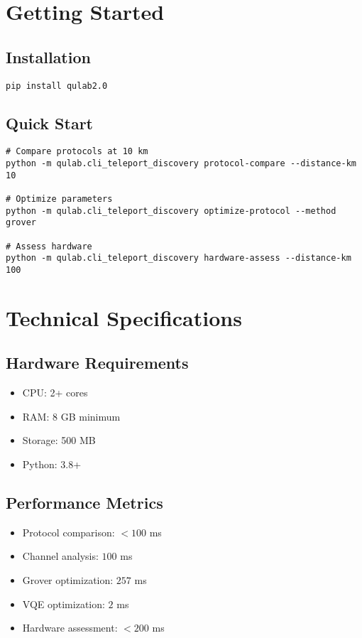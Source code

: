 \documentclass[11pt,a4paper]{article}
\begin{document}
\appendix

\section{Getting Started}

\subsection{Installation}

\begin{verbatim}
pip install qulab2.0
\end{verbatim}

\subsection{Quick Start}

\begin{verbatim}
# Compare protocols at 10 km
python -m qulab.cli_teleport_discovery protocol-compare --distance-km 10

# Optimize parameters
python -m qulab.cli_teleport_discovery optimize-protocol --method grover

# Assess hardware
python -m qulab.cli_teleport_discovery hardware-assess --distance-km 100
\end{verbatim}

\section{Technical Specifications}

\subsection{Hardware Requirements}

\begin{itemize}
    \item CPU: 2+ cores
    \item RAM: 8 GB minimum
    \item Storage: 500 MB
    \item Python: 3.8+
\end{itemize}

\subsection{Performance Metrics}

\begin{itemize}
    \item Protocol comparison: $< 100$ ms
    \item Channel analysis: $100$ ms
    \item Grover optimization: $257$ ms
    \item VQE optimization: $2$ ms
    \item Hardware assessment: $< 200$ ms
\end{itemize}
\end{document}
